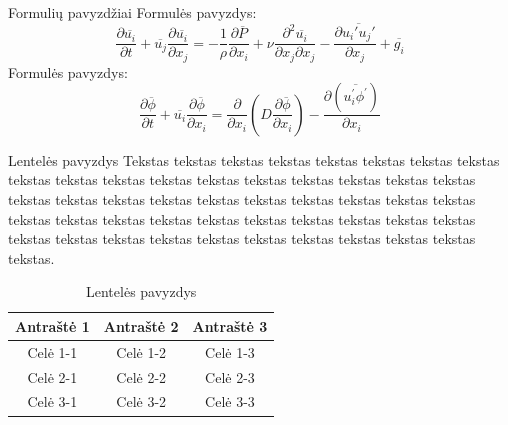 \documentclass[12pt]{beamer}
\begin{document}
\begin{frame}{Formulių pavyzdžiai}
  Formulės pavyzdys:
  \begin{equation}
      \frac{\partial \overline{u_{i}} }{\partial t} + \overline{u_{j}} \frac{\partial \overline{u_{i}} }{\partial x_{j}} = -\frac{1}{\rho}\frac{\partial \overline{P}}{\partial x_{i}}+\nu\frac{\partial ^2\overline{u_{i}}}{\partial x_{j}\partial x_{j}}-\frac{\partial \overline{u_{i}'u_{j}'}}{\partial x_{j}}+\overline{g_{i}}
  \end{equation}
    Formulės pavyzdys:
  \begin{equation}
     \frac{\partial \overline{\phi}}{\partial t}+\overline{u_{i}}\frac{\partial \overline{\phi}}{\partial x_{i}}=\frac{\partial}{\partial x_{i}}(D\frac{\partial \overline{\phi}}{\partial x_{i}})-\frac{\partial (\overline{{u_{i}^{'}\phi^{'}}})}{\partial x_{i}}
  \end{equation}
\end{frame}

\begin{frame}{Lentelės pavyzdys}
    Tekstas tekstas tekstas tekstas tekstas tekstas tekstas tekstas tekstas tekstas tekstas tekstas tekstas tekstas tekstas tekstas tekstas tekstas tekstas tekstas tekstas tekstas tekstas tekstas tekstas tekstas tekstas tekstas tekstas tekstas tekstas tekstas tekstas tekstas tekstas tekstas tekstas tekstas tekstas tekstas tekstas tekstas tekstas tekstas tekstas tekstas tekstas tekstas tekstas.
	\begin{table}
    	  \centering
        \caption{Lentelės pavyzdys}
    	  \begin{tabular}{|c|c|c|}
    		\hline
    		\textbf{Antraštė 1} & \textbf{Antraštė 2} & \textbf{Antraštė 3} \\
    		\hline
    		Celė 1-1 & Celė 1-2 & Celė 1-3 \\
    		\hline
    		Celė 2-1 & Celė 2-2 & Celė 2-3 \\
    		\hline
    		Celė 3-1 & Celė 3-2 & Celė 3-3 \\
    		\hline
    	  \end{tabular}
	\end{table}
\end{frame}
\end{document}
